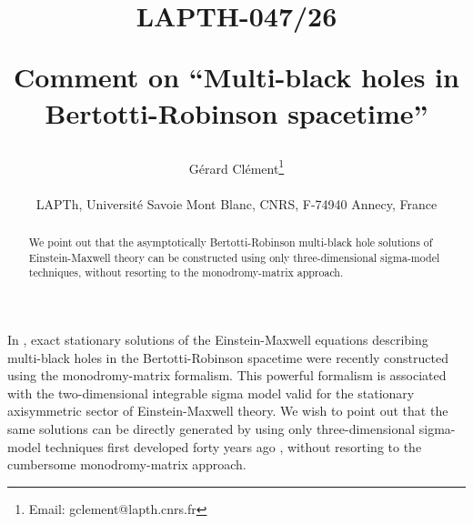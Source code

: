 \documentclass[11pt]{article}
\begin{document}
\begin{titlepage}

\date{}

\title{
\begin{flushright}\begin{small}    LAPTH-047/26
\end{small} \end{flushright} \vspace{1cm}
Comment on ``Multi-black holes in Bertotti-Robinson spacetime''}

\author{G\'erard Cl\'ement\thanks{Email: gclement@lapth.cnrs.fr} \\ \\
{\small LAPTh, Universit\'e Savoie Mont Blanc, CNRS, F-74940  Annecy, France}}

\maketitle

\begin{abstract}
We point out that the asymptotically Bertotti-Robinson multi-black hole solutions of Einstein-Maxwell theory can be constructed using only three-dimensional sigma-model techniques, without resorting to the monodromy-matrix approach.
\end{abstract}
\end{titlepage}
\setcounter{page}{2}

In \cite{furugori}, exact stationary solutions of the Einstein-Maxwell equations describing multi-black holes in the Bertotti-Robinson spacetime were recently constructed using the monodromy-matrix formalism. This powerful formalism is associated with the two-dimensional integrable sigma model valid for the stationary axisymmetric sector of Einstein-Maxwell theory. We wish to point out that the same solutions can be directly generated by using only three-dimensional sigma-model techniques first developed forty years ago \cite{spat}, without resorting to the cumbersome monodromy-matrix approach.
\end{document}
